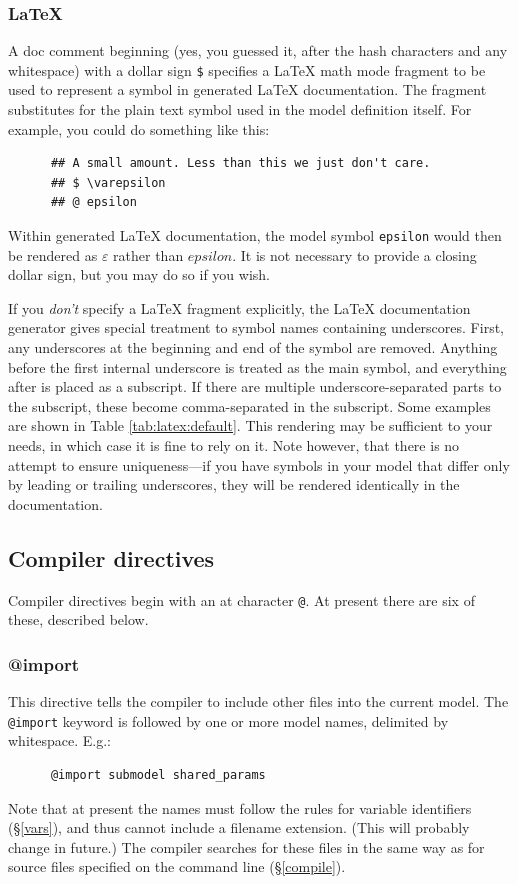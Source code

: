 \documentclass[a4paper,11pt]{article}
\begin{document}
\subsubsection*{\LaTeX}\label{model:latex}
A doc comment beginning (yes, you guessed it, after the hash characters and any whitespace) with a dollar sign \texttt{\$} specifies a \LaTeX{} math mode fragment to be used to represent a symbol in generated \LaTeX{} documentation. The fragment substitutes for the plain text symbol used in the model definition itself. For example, you could do something like this:
\begin{verbatim}
      ## A small amount. Less than this we just don't care.
      ## $ \varepsilon
      ## @ epsilon
\end{verbatim}
Within generated \LaTeX{} documentation, the model symbol \texttt{epsilon} would then be rendered as $\varepsilon$ rather than $epsilon$. It is not necessary to provide a closing dollar sign, but you may do so if you wish.

If you \textit{don't} specify a \LaTeX{} fragment explicitly, the \LaTeX{} documentation generator gives special treatment to symbol names containing underscores. First, any underscores at the beginning and end of the symbol are removed. Anything before the first internal underscore is treated as the main symbol, and everything after is placed as a subscript. If there are multiple underscore-separated parts to the subscript, these become comma-separated in the subscript. Some examples are shown in Table \ref{tab:latex:default}. This rendering may be sufficient to your needs, in which case it is fine to rely on it. Note however, that there is no attempt to ensure uniqueness---if you have symbols in your model that differ only by leading or trailing underscores, they will be rendered identically in the documentation.

\subsection{Compiler directives}
Compiler directives begin with an at character \texttt{@}. At present there are six of these, described below.

\subsubsection{@import}
This directive tells the compiler to include other files into the current model. The \texttt{@import} keyword is followed by one or more model names, delimited by whitespace. E.g.:
\begin{verbatim}
      @import submodel shared_params
\end{verbatim}
Note that at present the names must follow the rules for variable identifiers (\S\ref{vars}), and thus cannot include a filename extension. (This will probably change in future.) The compiler searches for these files in the same way as for source files specified on the command line (\S\ref{compile}).
\end{document}

